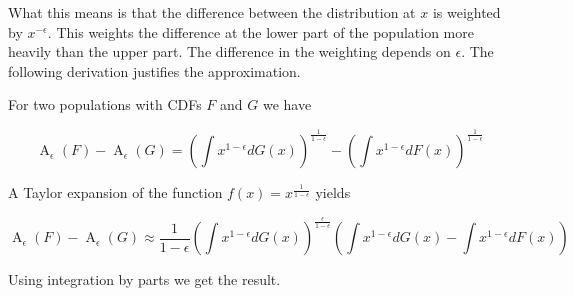 \documentclass[11pt, oneside]{article}  %
\DeclareMathOperator{\Atkinson}{A}
\begin{document}
What this means is that the difference between the distribution at \(x\) is weighted by \(x^{-\epsilon}\). This weights the difference at the lower part of the population more heavily than the upper part. The difference in the weighting depends on \(\epsilon\). The following derivation justifies the approximation.

For two populations with CDFs \(F\) and \(G\) we have

\[  \Atkinson_\epsilon(F)  - \Atkinson_\epsilon(G) = \left(\int x^{1-\epsilon} dG(x) \right)^{\frac{1}{1-\epsilon}} - \left(\int x^{1-\epsilon} dF(x) \right)^{\frac{1}{1-\epsilon}} \]

A Taylor expansion of the function \(f(x) = x^{\frac{1}{1-\epsilon}} \) yields

\[\Atkinson_\epsilon(F)  - \Atkinson_\epsilon(G)  \approx \frac{1}{1-\epsilon} \left(\int x^{1-\epsilon} dG(x) \right)^{\frac{\epsilon}{1-\epsilon}}  \left(\int x^{1-\epsilon} dG(x) - \int x^{1-\epsilon} dF(x) \right) \]

Using integration by parts we get the result.

\medskip

{}

\end{document}
